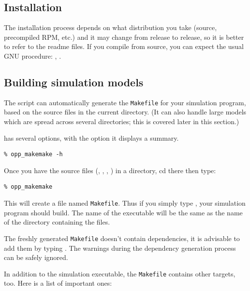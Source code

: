 \subsection{Installation}

The installation process depends on what distribution you take
(source, precompiled RPM, etc.) and it may change from release
to release, so it is better to refer to the readme files.
If you compile from source, you can expect the usual GNU
procedure: , .


\subsection{Building simulation models}

The  script can automatically generate the
\texttt{Makefile} for your simulation program, based on the source files
in the current directory. (It can also handle large models
which are spread across several directories; this is covered later in
this section.)

 has several options, with the 
option it displays a summary.

\begin{verbatim}
% opp_makemake -h
\end{verbatim}

Once you have the source files (, , ,
) in a directory, cd there then type:

\begin{verbatim}
% opp_makemake
\end{verbatim}

This will create a file named \texttt{Makefile}. Thus if you
simply type , your simulation program should build. The name of
the executable will be the same as the name of the directory
containing the files.


The freshly generated \texttt{Makefile} doesn't contain
dependencies, it is advisable to add them
by typing . The warnings during the
dependency generation process can be safely ignored.

In addition to the simulation executable, the \texttt{Makefile}
contains other targets, too. Here is a list of important ones:


